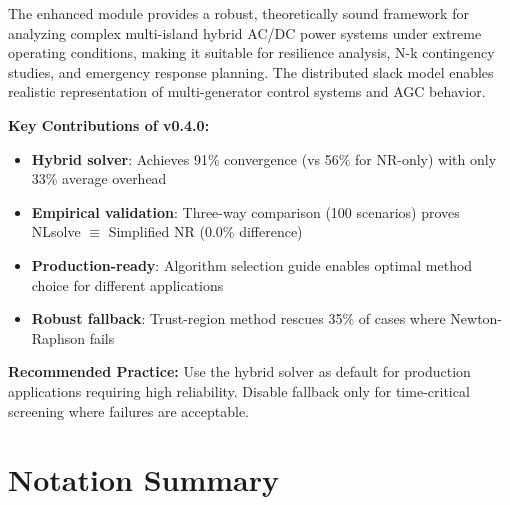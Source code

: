 \documentclass[11pt]{article}
\begin{document}
The enhanced module provides a robust, theoretically sound framework for analyzing complex multi-island hybrid AC/DC power systems under extreme operating conditions, making it suitable for resilience analysis, N-k contingency studies, and emergency response planning. The distributed slack model enables realistic representation of multi-generator control systems and AGC behavior.

\textbf{Key Contributions of v0.4.0:}
\begin{itemize}
    \item \textbf{Hybrid solver}: Achieves 91\% convergence (vs 56\% for NR-only) with only 33\% average overhead
    \item \textbf{Empirical validation}: Three-way comparison (100 scenarios) proves NLsolve $\equiv$ Simplified NR (0.0\% difference)
    \item \textbf{Production-ready}: Algorithm selection guide enables optimal method choice for different applications
    \item \textbf{Robust fallback}: Trust-region method rescues 35\% of cases where Newton-Raphson fails
\end{itemize}

\textbf{Recommended Practice:}
Use the hybrid solver as default for production applications requiring high reliability. Disable fallback only for time-critical screening where failures are acceptable.

\appendix

\section{Notation Summary}
\end{document}
